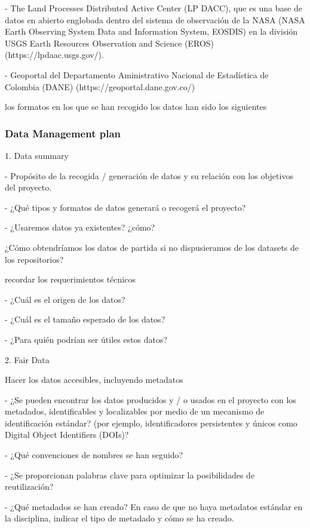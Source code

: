 \documentclass[12pt, spanish]{article}
\begin{document}
- The Land Processes Distributed Active Center (LP DACC), que es una base de datos en abierto englobada dentro del sistema de observación de la NASA (NASA Earth Observing System Data and Information System, EOSDIS) en la división USGS Earth Resources Observation and Science (EROS) (https://lpdaac.usgs.gov/).

- Geoportal del Departamento Aministrativo Nacional de Estadística de Colombia (DANE) (https://geoportal.dane.gov.co/)

los formatos en los que se han recogido los datos han sido los siguientes

\subsubsection{Data Management plan}

1. Data summary

- Propósito de la recogida / generación de datos y su relación con los objetivos del proyecto.

- ¿Qué tipos y formatos de datos generará o recogerá  el proyecto?

- ¿Usaremos datos ya existentes? ¿cómo?


¿Cómo obtendríamos los datos de partida si no dispusieramos de los datasets de los repositorios?

recordar los requerimientos técnicos 



- ¿Cuál es el origen de los datos?

- ¿Cuál es el tamaño esperado de los datos?

- ¿Para quién podrían ser útiles estos datos?

2. Fair Data

Hacer los datos accesibles, incluyendo metadatos

- ¿Se pueden encontrar los datos producidos y / o usados en el proyecto con los metadados, identificables y localizables por medio de un mecanismo  de identificación estándar? (por ejemplo, identificadores persistentes y únicos como Digital Object Identifiers (DOIs)?

- ¿Qué convenciones de nombres se han seguido?

- ¿Se proporcionan palabras clave para optimizar la posibilidades de reutilización?

- ¿Qué metadados se han creado? En caso de que no haya metadatos estándar en la disciplina, indicar el tipo de metadado y cómo se ha creado.

































\end{document}
